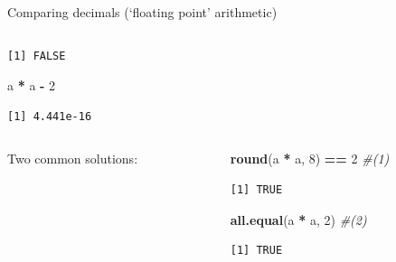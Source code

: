 \documentclass[
  11pt,
  ignorenonframetext,
]{beamer}
\newcommand{\VERB}{\Verb[commandchars=\\\{\}]}
\newenvironment{Shaded}{\begin{snugshade}}{\end{snugshade}}
\newcommand{\CommentTok}[1]{\textcolor[rgb]{0.56,0.35,0.01}{\textit{#1}}}
\newcommand{\DecValTok}[1]{\textcolor[rgb]{0.00,0.00,0.81}{#1}}
\newcommand{\FunctionTok}[1]{\textcolor[rgb]{0.13,0.29,0.53}{\textbf{#1}}}
\newcommand{\NormalTok}[1]{#1}
\newcommand{\SpecialCharTok}[1]{\textcolor[rgb]{0.81,0.36,0.00}{\textbf{#1}}}
\providecommand{\tightlist}{%
  \setlength{\itemsep}{0pt}\setlength{\parskip}{0pt}}
\begin{document}
\begin{frame}{Comparing decimals (`floating point'
arithmetic)}
\begin{columns}[T,onlytextwidth]
\begin{column}{0.48\textwidth}
\begin{verbatim}
[1] FALSE
\end{verbatim}

\begin{Shaded}
\begin{Highlighting}[]
\NormalTok{a }\SpecialCharTok{*}\NormalTok{ a }\SpecialCharTok{{-}} \DecValTok{2}
\end{Highlighting}
\end{Shaded}

\begin{verbatim}
[1] 4.441e-16
\end{verbatim}
\end{column}
\end{columns}

\begin{columns}[T,onlytextwidth]
\begin{column}{0.48\textwidth}
Two common solutions:

\end{column}

\begin{column}{0.48\textwidth}
\begin{Shaded}
\begin{Highlighting}[]
\FunctionTok{round}\NormalTok{(a }\SpecialCharTok{*}\NormalTok{ a, }\DecValTok{8}\NormalTok{) }\SpecialCharTok{==} \DecValTok{2}  \CommentTok{\#(1)}
\end{Highlighting}
\end{Shaded}

\begin{verbatim}
[1] TRUE
\end{verbatim}

\begin{Shaded}
\begin{Highlighting}[]
\FunctionTok{all.equal}\NormalTok{(a }\SpecialCharTok{*}\NormalTok{ a, }\DecValTok{2}\NormalTok{)   }\CommentTok{\#(2)}
\end{Highlighting}
\end{Shaded}

\begin{verbatim}
[1] TRUE
\end{verbatim}
\end{column}
\end{columns}
\end{frame}
\end{document}
